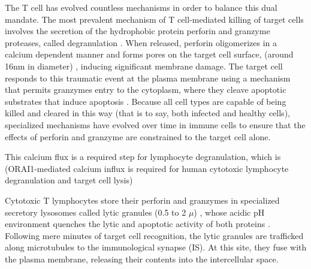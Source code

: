 The T cell has evolved countless mechanisms in order to balance this dual mandate. The most prevalent mechanism of T cell-mediated killing of target cells involves the secretion of the hydrophobic protein perforin and granzyme proteases, called degranulation \cite{Dustin2010, Stinchcombe2007}. When released, perforin oligomerizes in a calcium dependent manner \cite{Law2010} and forms pores on the target cell surface, (around 16nm in diameter) \cite{Cartwright2014}, inducing significant membrane damage. The target cell responds to this traumatic event at the plasma membrane using a mechanism that permits granzymes entry to the cytoplasm, where they cleave apoptotic substrates that induce apoptosis \cite{Keefe2005}. Because all cell types are capable of being killed and cleared in this way (that is to say, both infected and healthy cells),  specialized mechanisms have evolved over time in immune cells to ensure that the effects of perforin and granzyme are constrained to the target cell alone.  

This calcium flux is a required step for lymphocyte degranulation, which is (ORAI1-mediated calcium influx is required for human cytotoxic lymphocyte degranulation and target cell lysis)

Cytotoxic T lymphocytes store their perforin and granzymes in specialized secretory lysosomes called lytic granules (0.5 to 2 $\mu$) \cite{Sanchez-Ruiz2011}, whose acidic pH environment quenches the lytic and apoptotic activity of both proteins \cite{Thiery2014, Keefe2005}. Following mere minutes of target cell recognition, the lytic granules are trafficked along microtubules to the immunological synapse (IS). At this site, they fuse with the plasma membrane, releasing their contents into the intercellular space.

